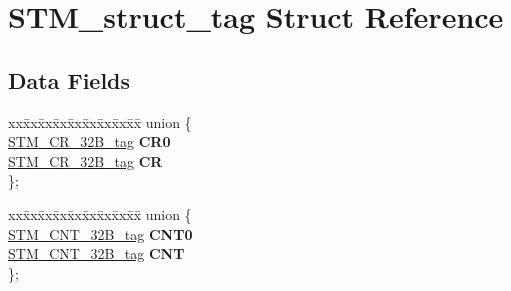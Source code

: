 \hypertarget{structSTM__struct__tag}{}\section{S\+T\+M\+\_\+struct\+\_\+tag Struct Reference}
\label{structSTM__struct__tag}
\subsection*{Data Fields}
\begin{DoxyCompactItemize}
\item 
\mbox{\label{structSTM__struct__tag_ab03384320fefff922e8edc45fdc06b58}} 
\begin{tabbing}
xx\=xx\=xx\=xx\=xx\=xx\=xx\=xx\=xx\=\kill
union \{\\
\>\mbox{\hyperlink{unionSTM__CR__32B__tag}{STM\_CR\_32B\_tag}} {\bfseries CR0}\\
\>\mbox{\hyperlink{unionSTM__CR__32B__tag}{STM\_CR\_32B\_tag}} {\bfseries CR}\\
\}; \\

\end{tabbing}\item 
\mbox{\label{structSTM__struct__tag_a2ce8ee283ce49cba87e06077e014eb75}} 
\begin{tabbing}
xx\=xx\=xx\=xx\=xx\=xx\=xx\=xx\=xx\=\kill
union \{\\
\>\mbox{\hyperlink{unionSTM__CNT__32B__tag}{STM\_CNT\_32B\_tag}} {\bfseries CNT0}\\
\>\mbox{\hyperlink{unionSTM__CNT__32B__tag}{STM\_CNT\_32B\_tag}} {\bfseries CNT}\\
\}; \\


\end{tabbing}
\end{DoxyCompactItemize}
